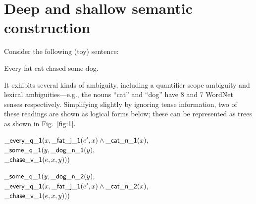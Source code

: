 \section{Deep and shallow semantic construction}
\label{sec:motivation}

Consider the
following (toy) sentence:

\begin{examples}
  \item Every fat cat chased some dog.
\end{examples}

It exhibits several kinds of ambiguity, including a quantifier scope
ambiguity and lexical
ambiguities---e.g., the nouns ``cat'' and ``dog'' have 8 and 7
WordNet senses respectively.  Simplifying slightly by ignoring tense
information, two of these readings are shown as logical forms below;
these can be represented as trees as shown in Fig.~\ref{fig:1}.

\begin{examples}
\item $\mathsf{\_every\_q\_1}(x, \mathsf{\_fat\_j\_1}(e',x) \wedge
    \mathsf{\_cat\_n\_1}(x),$\\
\hspace*{0.1in} $\mathsf{\_some\_q\_1}(y, \mathsf{\_dog\_n\_1}(y),$\\
\hspace*{0.2in}$\mathsf{\_chase\_v\_1}(e,x,y)))$
\label{ex:fat-cat-1}
\item $\mathsf{\_some\_q\_1}(y, \mathsf{\_dog\_n\_2}(y),$\\
\hspace*{0.1in}$\mathsf{\_every\_q\_1}(x, \mathsf{\_fat\_j\_1}(e',x) \wedge
    \mathsf{\_cat\_n\_2}(x), $\\
\hspace*{0.2in}$\mathsf{\_chase\_v\_1}(e,x,y)))$
\label{ex:fat-cat-2}
\end{examples}


